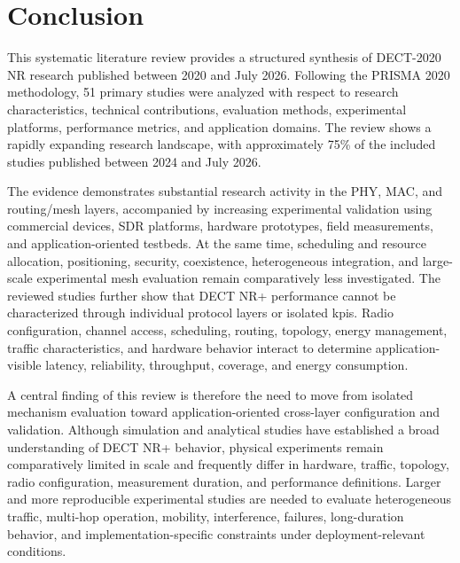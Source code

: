 \section{Conclusion}
\label{sec:conclusion}

This systematic literature review provides a structured synthesis of
DECT-2020 NR research published between 2020 and July 2026. Following the
PRISMA 2020 methodology, 51 primary studies were analyzed with respect to
research characteristics, technical contributions, evaluation methods,
experimental platforms, performance metrics, and application domains. The
review shows a rapidly expanding research landscape, with approximately 75\%
of the included studies published between 2024 and July 2026.

The evidence demonstrates substantial research activity in the PHY, MAC, and
routing/mesh layers, accompanied by increasing experimental validation using
commercial devices, SDR platforms, hardware prototypes, field measurements,
and application-oriented testbeds. At the same time, scheduling and resource
allocation, positioning, security, coexistence, heterogeneous integration, and
large-scale experimental mesh evaluation remain comparatively less
investigated. The reviewed studies further show that DECT NR+ performance
cannot be characterized through individual protocol layers or isolated
\glspl{kpi}. Radio configuration, channel access, scheduling, routing,
topology, energy management, traffic characteristics, and hardware behavior
interact to determine application-visible latency, reliability, throughput,
coverage, and energy consumption.

A central finding of this review is therefore the need to move from isolated
mechanism evaluation toward application-oriented cross-layer configuration and
validation. Although simulation and analytical studies have established a
broad understanding of DECT NR+ behavior, physical experiments remain
comparatively limited in scale and frequently differ in hardware, traffic,
topology, radio configuration, measurement duration, and performance
definitions. Larger and more reproducible experimental studies are needed to
evaluate heterogeneous traffic, multi-hop operation, mobility, interference,
failures, long-duration behavior, and implementation-specific constraints
under deployment-relevant conditions.

